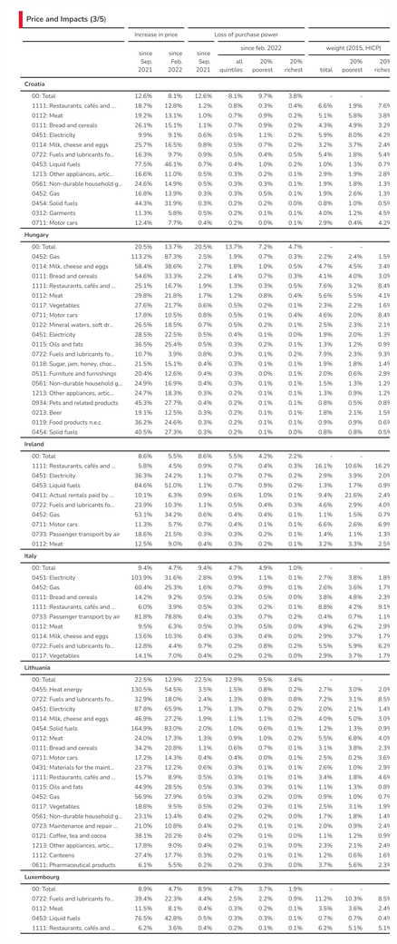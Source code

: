 \documentclass[
  9pt,
  a4paper,
  numbers=noendperiod,
  DIV=12]{scrartcl}
\begin{document}
\includegraphics{svg/annex_3.png}
\end{document}
